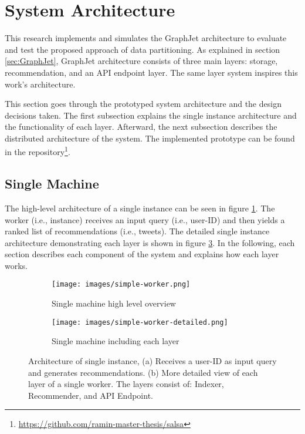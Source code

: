 \section{System Architecture}
\label{sec:system-architecture}

This research implements and simulates the GraphJet architecture to evaluate and test the proposed approach of data partitioning. As explained in section \ref{sec:GraphJet}, GraphJet architecture consists of three main layers: storage, recommendation, and an API endpoint layer. The same layer system inspires this work's architecture. 


This section goes through the prototyped system architecture and the design decisions taken. The first subsection explains the single instance architecture and the functionality of each layer. Afterward, the next subsection describes the distributed architecture of the system. The implemented prototype can be found in the repository\footnote{\url{https://github.com/ramin-master-thesis/salsa}}.


\subsection{Single Machine}
\label{subsec:single-machine}
The high-level architecture of a single instance can be seen in figure \ref{fig:single-machine-architecture}. The worker (i.e., instance) receives an input query (i.e., user-ID) and then yields a ranked list of recommendations (i.e., tweets). The detailed single instance architecture demonstrating each layer is shown in figure \ref{fig:single-machine-architecture-detailed}. In the following, each section describes each component of the system and explains how each layer works.

\begin{figure}[!ht]
    \centering
    \begin{subfigure}[b]{0.75\textwidth}
       \texttt{[image: images/simple-worker.png]}
       \caption{Single machine high level overview}
       \label{fig:single-machine-architecture} 
    \end{subfigure}
    
    \begin{subfigure}[b]{0.8\textwidth}
       \texttt{[image: images/simple-worker-detailed.png]}
       \caption{Single machine including each layer}
       \label{fig:single-machine-architecture-detailed}
    \end{subfigure}
    
    \caption {Architecture of single instance, (a) Receives a user-ID as input query and generates recommendations. (b) More detailed view of each layer of a single worker. The layers consist of: Indexer, Recommender, and API Endpoint.}
\end{figure}


